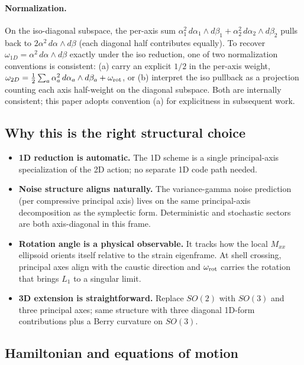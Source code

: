 \documentclass[11pt]{article}
\begin{document}
\paragraph{Normalization.} On the iso-diagonal subspace, the per-axis sum
$\alpha_1^2\,d\alpha_1\wedge d\beta_1 + \alpha_2^2\,d\alpha_2\wedge d\beta_2$
pulls back to $2\alpha^2\,d\alpha\wedge d\beta$ (each diagonal half
contributes equally). To recover $\omega_{1D} = \alpha^2\,d\alpha\wedge d\beta$
exactly under the iso reduction, one of two normalization conventions
is consistent: (a) carry an explicit $1/2$ in the per-axis weight,
$\omega_{2D} = \tfrac{1}{2}\sum_a \alpha_a^2\,d\alpha_a\wedge d\beta_a + \omega_{\rm rot}$,
or (b) interpret the iso pullback as a projection counting each axis
half-weight on the diagonal subspace. Both are internally consistent;
this paper adopts convention (a) for explicitness in subsequent work.

\subsection{Why this is the right structural choice}

\begin{itemize}
\item \textbf{1D reduction is automatic.} The 1D scheme is a single
principal-axis specialization of the 2D action; no separate 1D code
path needed.
\item \textbf{Noise structure aligns naturally.} The variance-gamma
noise prediction (per compressive principal axis) lives on the same
principal-axis decomposition as the symplectic form. Deterministic
and stochastic sectors are both axis-diagonal in this frame.
\item \textbf{Rotation angle is a physical observable.} It tracks how
the local $M_{xx}$ ellipsoid orients itself relative to the strain
eigenframe. At shell crossing, principal axes align with the caustic
direction and $\omega_{\rm rot}$ carries the rotation that brings $L_1$
to a singular limit.
\item \textbf{3D extension is straightforward.} Replace $SO(2)$ with
$SO(3)$ and three principal axes; same structure with three diagonal
1D-form contributions plus a Berry curvature on $SO(3)$.
\end{itemize}

\subsection{Hamiltonian and equations of motion}
\end{document}
